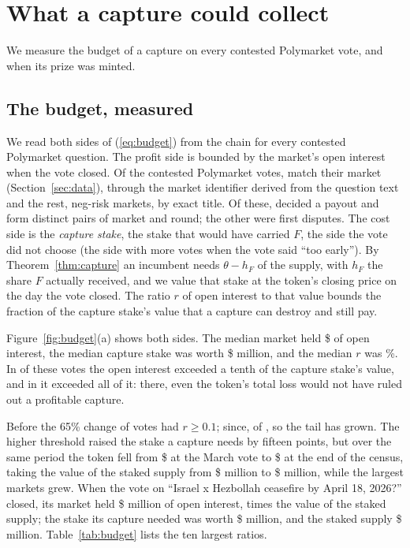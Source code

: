 \documentclass[conference,compsoc]{IEEEtran}
\newcommand{\hF}{h_{F}}
\begin{document}
\section{What a capture could collect}
\label{sec:collect}
We measure the budget of a capture on every contested Polymarket vote, and when its prize was minted.

\subsection{The budget, measured}
\label{sec:budget}
 We read both sides of (\ref{eq:budget}) from the chain for every contested Polymarket question. The profit side is bounded by the market's open interest when the vote closed. Of the \nEconContested{} contested Polymarket votes, \nEconMatched{} match their market (Section~\ref{sec:data}), \nEconDerived{} through the market identifier derived from the question text and the rest, neg-risk markets, by exact title. Of these, \nEconPayoutRequests{} decided a payout and form \nEconMarkets{} distinct pairs of market and round; the other \nEconBondOnlyRequests{} were first disputes. The cost side is the \emph{capture stake}, the stake that would have carried $F$, the side the vote did not choose (the side with more votes when the vote said ``too early''). By Theorem~\ref{thm:capture} an incumbent needs $\theta - \hF$ of the supply, with $\hF$ the share $F$ actually received, and we value that stake at the token's closing price on the day the vote closed. The ratio $r$ of open interest to that value bounds the fraction of the capture stake's value that a capture can destroy and still pay.

 Figure~\ref{fig:budget}(a) shows both sides. The median market held \$\econOIMedian{} of open interest, the median capture stake was worth \$\econVMedianM{} million, and the median $r$ was \econDeltaMedianPct\%. In \econDeltaGeTenth{} of these votes the open interest exceeded a tenth of the capture stake's value, and in \econDeltaGeOne{} it exceeded all of it: there, even the token's total loss would not have ruled out a profitable capture.

 Before the 65\% change \econDeltaGeTenthEraA{} of \econMarketsEraA{} votes had $r \ge 0.1$; since, \econDeltaGeTenthEraB{} of \econMarketsEraB{}, so the tail has grown. The higher threshold raised the stake a capture needs by fifteen points, but over the same period the token fell from \$\umaPriceMarch{} at the March vote to \$\umaPriceNow{} at the end of the census, taking the value of the staked supply from \$\marchStakeUsdM{} million to \$\stakeNowUsdM{} million, while the largest markets grew. When the vote on ``Israel x Hezbollah ceasefire by April 18, 2026?'' closed, its market held \$\econTopOIM{} million of open interest, \econTopOverStake{} times the value of the staked supply; the stake its capture needed was worth \$\econTopVM{} million, and the staked supply \$\econTopStakeValueM{} million. Table~\ref{tab:budget} lists the ten largest ratios.
\end{document}
